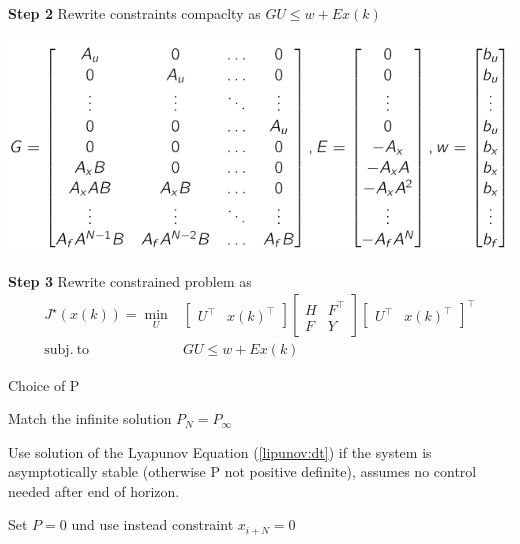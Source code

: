 \textbf{Step 2} Rewrite constraints compaclty as $GU\le w+Ex(k)$

\includegraphics[width=\columnwidth]{images/qp_with_substitution.png}

\textbf{Step 3} Rewrite constrained problem as
\[\begin{aligned}
		J^\star(x(k)) = \min_U
		                       & \begin{bmatrix}
			                         U^\top & x(k)^\top
		                         \end{bmatrix}
		\left[\begin{smallmatrix}
				      H & F^\top \\
				      F & Y
			      \end{smallmatrix}\right]
		\begin{bmatrix}
			U^\top & x(k)^\top
		\end{bmatrix}^\top                          \\
		\mathrm{subj. \ to \ } & GU \leq w + Ex(k)
	\end{aligned} \]


\begin{sstTitleBox}[BrickRed]{
		Choice of P
	}
	\begin{sstOnlyFrame}[BrickRed]
		Match the infinite solution $P_N = P_\infty$

		Use solution of the Lyapunov Equation (\ref{lipunov:dt})
		if the system is asymptotically stable
		(otherwise P not positive definite),
		assumes no control needed after end of horizon.

		Set $P=0$ und use instead constraint $x_{i+N}=0$
	\end{sstOnlyFrame}
\end{sstTitleBox}
